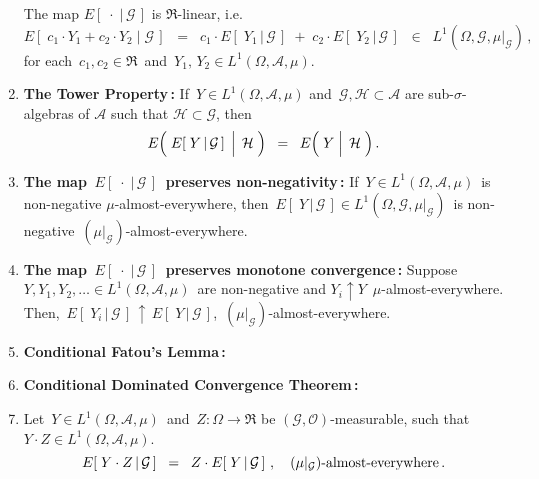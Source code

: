\begin{theorem}
\begin{enumerate}
	The map $E\!\left[\;\cdot\;\vert\,\mathcal{G}\,\right]$ is $\Re$-linear, i.e.
	\begin{equation*}
	E\!\left[\;c_{1}\cdot Y_{1} + c_{2}\cdot Y_{2}\;\vert\;\mathcal{G}\,\right]
	\;\; = \;\;
	c_{1}\cdot E\!\left[\;Y_{1}\,\vert\,\mathcal{G}\,\right]
	\; + \;
	c_{2}\cdot E\!\left[\;Y_{2}\,\vert\,\mathcal{G}\,\right]
	\;\; \in \;\; L^{1}\!\left(\Omega,\mathcal{G},\mu\vert_{\mathcal{G}}\right)
	\,,
	\end{equation*}
	for each \,$c_{1}, c_{2} \in \Re$\, and \,$Y_{1}, \, Y_{2} \in L^{1}\!\left(\Omega,\mathcal{A},\mu\right)$.
\item\label{ConditionalExpectationTowerProperty}
	\textbf{The Tower Property\,:}
	\vskip 0.0cm
	If \,$Y \in L^{1}\!\left(\Omega,\mathcal{A},\mu\right)$
	and \,$\mathcal{G}, \mathcal{H} \subset \mathcal{A}$ are sub-$\sigma$-algebras of $\mathcal{A}$
	such that $\mathcal{H} \subset \mathcal{G}$, then
	\begin{equation*}
	E\!\left(\,\left.\overset{{\color{white}.}}{E}\!\left[\;Y\,\vert\,\mathcal{G}\,\right]\;\,\right\vert\;\mathcal{H}\;\right)
	\;\; = \;\;
	E\!\left(\,\left.\overset{{\color{white}.}}{Y}\;\right\vert\;\mathcal{H}\;\right).
	\end{equation*}	
\item\label{ConditionalExpectationPreservesNonnegativity}
	\textbf{The map \,$E\!\left[\;\cdot\;\vert\,\mathcal{G}\,\right]$\, preserves non-negativity\,:}
	\vskip 0.0cm
	If \,$Y \in L^{1}\!\left(\Omega,\mathcal{A},\mu\right)$\,
	is non-negative $\mu$-almost-everywhere, then
	\,$E\!\left[\;Y\,\vert\,\mathcal{G}\,\right] \in L^{1}\!\left(\Omega,\mathcal{G},\mu\vert_{\mathcal{G}}\right)$\,
	is non-negative \,$(\mu\vert_{\mathcal{G}})$-almost-everywhere.
\item\label{ConditionalMonotoneConvergence}
	\textbf{The map \,$E\!\left[\;\cdot\;\vert\,\mathcal{G}\,\right]$\, preserves monotone convergence\,:}
	\vskip 0.0cm
	Suppose \,$Y, Y_{1}, Y_{2}, \ldots \in L^{1}(\Omega,\mathcal{A},\mu)$\,
	are non-negative and
	\;$Y_{i} \uparrow Y$\,
	$\mu$-almost-everywhere.
	\vskip 0.0cm
	Then, \,$E\!\left[\;Y_{i}\,\vert\,\mathcal{G}\,\right] \,\uparrow\, E\!\left[\;Y\,\vert\,\mathcal{G}\,\right]$,\,
	$(\mu\vert_{\mathcal{G}})$-almost-everywhere.	
\item\label{ConditionalFatouLemma}
	\textbf{Conditional Fatou's Lemma\,:}
\item\label{ConditionalDominatedConvergence}
	\textbf{Conditional Dominated Convergence Theorem\,:}
\item\label{FactorOutWhatIsKnown}
	Let \,$Y \in L^{1}(\Omega,\mathcal{A},\mu)$\, and \,$Z : \Omega \longrightarrow \Re$ be
	$(\mathcal{G},\mathcal{O})$-measurable, such that
	\,$Y \cdot Z \in L^{1}(\Omega,\mathcal{A},\mu)$.
	\begin{equation*}
	E\!\left[\;Y \cdot Z\,\vert\,\mathcal{G}\,\right]
	\;\; = \;\;
	Z \cdot E\!\left[\;Y\,\vert\,\mathcal{G}\,\right]\,,
	\quad
	\textnormal{$(\mu\vert_{\mathcal{G}})$-almost-everywhere}\,.
	\end{equation*}
\end{enumerate}
\end{theorem}

